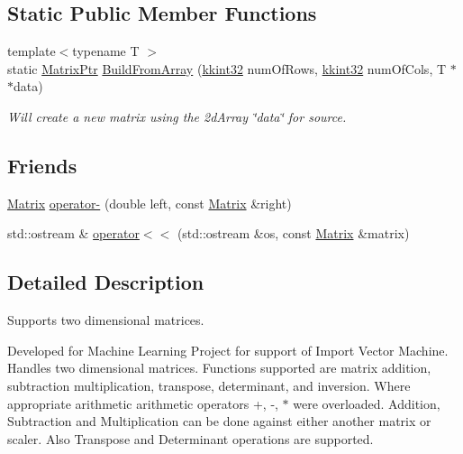 \subsection*{Static Public Member Functions}
\begin{DoxyCompactItemize}
\item 
{\footnotesize template$<$typename T $>$ }\\static \hyperlink{class_k_k_b_1_1_matrix_ad532bd6e9d0aa9b54e78f0feec5741a3}{Matrix\+Ptr} \hyperlink{class_k_k_b_1_1_matrix_a4bda3a321f99acd63746661b2f7a8ea8}{Build\+From\+Array} (\hyperlink{namespace_k_k_b_a8fa4952cc84fda1de4bec1fbdd8d5b1b}{kkint32} num\+Of\+Rows, \hyperlink{namespace_k_k_b_a8fa4952cc84fda1de4bec1fbdd8d5b1b}{kkint32} num\+Of\+Cols, T $\ast$$\ast$data)
\begin{DoxyCompactList}\small\item\em Will create a new matrix using the 2d\+Array \char`\"{}data\char`\"{} for source. \end{DoxyCompactList}\end{DoxyCompactItemize}
\subsection*{Friends}
\begin{DoxyCompactItemize}
\item 
\hyperlink{class_k_k_b_1_1_matrix}{Matrix} \hyperlink{class_k_k_b_1_1_matrix_aa6ed460f16c161718d4178f62cc3afbf}{operator-\/} (double left, const \hyperlink{class_k_k_b_1_1_matrix}{Matrix} \&right)
\item 
std\+::ostream \& \hyperlink{class_k_k_b_1_1_matrix_a9597a390480e6b835e8b6c3c22d00d93}{operator$<$$<$} (std\+::ostream \&os, const \hyperlink{class_k_k_b_1_1_matrix}{Matrix} \&matrix)
\end{DoxyCompactItemize}


\subsection{Detailed Description}
Supports two dimensional matrices. 

Developed for Machine Learning Project for support of Import Vector Machine. Handles two dimensional matrices. Functions supported are matrix addition, subtraction multiplication, transpose, determinant, and inversion. Where appropriate arithmetic arithmetic operators +, -\/, $\ast$ were overloaded. Addition, Subtraction and Multiplication can be done against either another matrix or scaler. Also Transpose and Determinant operations are supported. 

